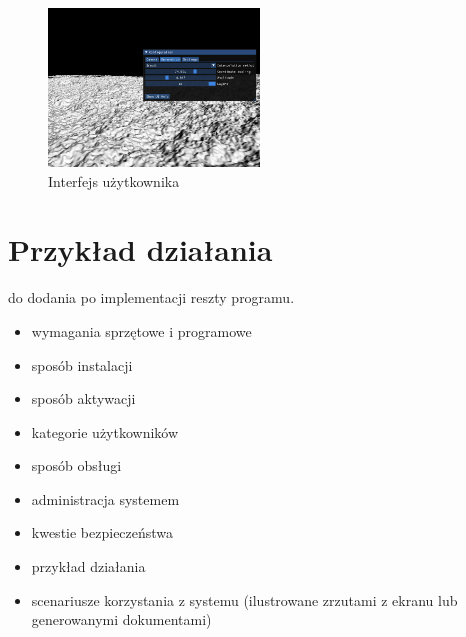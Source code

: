\begin{figure}
\centering
\includegraphics[width=0.5\textwidth]{./graf/ui.png}
\caption{Interfejs użytkownika}
\label{fig:ui}
\end{figure}


\section{Przykład działania}
do dodania po implementacji reszty programu.


\begin{itemize}
\item  wymagania sprzętowe i programowe
\item  sposób instalacji
\item  sposób aktywacji
\item  kategorie użytkowników
\item  sposób obsługi
\item  administracja systemem
\item  kwestie bezpieczeństwa
\item  przykład działania
\item  scenariusze korzystania z systemu (ilustrowane zrzutami z ekranu lub generowanymi dokumentami)
\end{itemize}

